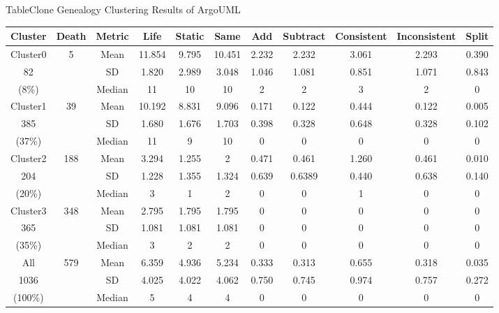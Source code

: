 { 
\begin{table}[htbp]
{Table$\!$}{Clone Genealogy Clustering Results of ArgoUML}
\vspace{0.5em}
\centering
\footnotesize
\begin{tabular}{ccccccccccc}
\toprule[1.5pt]
Cluster&Death&Metric&Life&	Static&	Same&	Add	&Subtract&	Consistent&	Inconsistent&	Split\\ 
\midrule[1pt]
Cluster0&\multirow{3}{*}{5}&Mean	&11.854	&9.795	&10.451	&2.232&	2.232&	3.061&	2.293&	0.390\\ 
\cline{3-11}
82&&SD&1.820&2.989&	3.048&	1.046&	1.081&0.851&1.071&	0.843\\ \cline{3-11}
(8\%)&&Median	&11&	10&	10&	2&	2&	3&	2	&0\\ \hline
Cluster1&\multirow{3}{*}{39}&Mean	&10.192&8.831&9.096	&0.171&0.122	&0.444&0.122&0.005\\ 
\cline{3-11}
385&&SD&	1.680	&1.676&1.703&0.398&	0.328	&0.648&	0.328	&0.102\\ 
\cline{3-11}
(37\%)&&Median	&11	&9	&10	&0&	0&	0&	0	&0\\ 
\hline
Cluster2&\multirow{3}{*}{188}&Mean	&3.294&1.255	&2	&0.471&0.461&1.260	&0.461	&0.010\\ \cline{3-11}
204&&SD&1.228&1.355&1.324&0.639&0.6389&0.440&0.638&0.140\\ 
\cline{3-11}
(20\%)&&Median	&3&	1&	2&	0&	0&	1&	0&	0\\ 
\hline
Cluster3&\multirow{3}{*}{348}&Mean	&2.795	&1.795	&1.795	&0	&0	&0	&0	&0\\ 
\cline{3-11}
365&&SD&1.081	&1.081&1.081&0	&0	&0	&0	&0\\ 
\cline{3-11}
(35\%)&&Median	&3	&2	&2	&0	&0	&0&	0&	0\\ 
\hline
All&\multirow{3}{*}{579}&Mean	&6.359&4.936&5.234&0.333	&0.313&0.655	&0.318&0.035\\ 
\cline{3-11}
1036&&SD&4.025	&4.022	&4.062	&0.750	&0.745&0.974&0.757&0.272\\ 
\cline{3-11}
(100\%)&&Median&	5&	4&	4&	0&	0&	0&	0&	0\\
\bottomrule[1.5pt]
\end{tabular}
\end{table}

}
